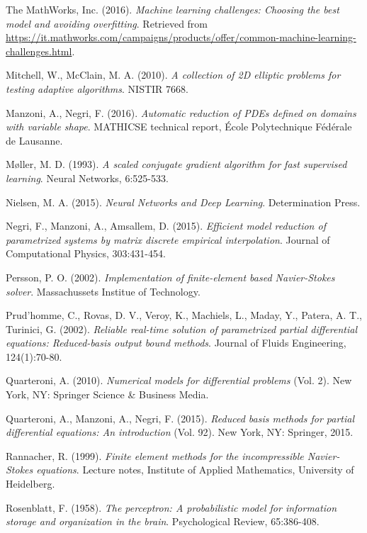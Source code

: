 \documentclass[longtitle]{elsarticle}
\numberwithin{equation}{section}
\theoremstyle{theorem}
\theoremstyle{definition}
\theoremstyle{remark}
\theoremstyle{proposition}
\numberwithin{figure}{section}
\begin{document}
\begin{thebibliography}{50}
		The MathWorks, Inc. (2016). \emph{Machine learning challenges: Choosing the best model and avoiding overfitting}. Retrieved from \url{https://it.mathworks.com/campaigns/products/offer/common-machine-learning-challenges.html}.
		
		Mitchell, W., McClain, M. A. (2010). \emph{A collection of 2D elliptic problems for testing adaptive algorithms}. NISTIR 7668.
		
		Manzoni, A., Negri, F. (2016). \emph{Automatic reduction of PDEs defined on domains with variable shape}. MATHICSE technical report, \'Ecole Polytechnique F\'ed\'erale de Lausanne.
		
		\textcolor{deepgreen}{
			M\o{}ller, M. D. (1993). \emph{A scaled conjugate gradient algorithm for fast supervised learning}. Neural Networks, 6:525-533.
		}

		Nielsen, M. A. (2015). \emph{Neural Networks and Deep Learning}. Determination Press.
				
		Negri, F., Manzoni, A., Amsallem, D. (2015). \emph{Efficient model reduction of parametrized systems by matrix discrete empirical interpolation}. Journal of Computational Physics, 303:431-454.
		
		Persson, P. O. (2002). \emph{Implementation of finite-element based Navier-Stokes solver}. Massachussets Institue of Technology.
		
		Prud'homme, C., Rovas, D. V., Veroy, K., Machiels, L., Maday, Y., Patera, A. T., Turinici, G. (2002). \emph{Reliable real-time solution of parametrized partial differential equations: Reduced-basis output bound methods}. Journal of Fluids Engineering, 124(1):70-80.
		
		Quarteroni, A. (2010). \emph{Numerical models for differential problems} (Vol. 2). New York, NY: Springer Science \& Business Media.
		
		Quarteroni, A., Manzoni, A., Negri, F. (2015). \emph{Reduced basis methods for partial differential equations: An introduction} (Vol. 92). New York, NY: Springer, 2015.
		
		Rannacher, R. (1999). \emph{Finite element methods for the incompressible Navier-Stokes equations}. Lecture notes, Institute of Applied Mathematics, University of Heidelberg.
		
		Rosenblatt, F. (1958). \emph{The perceptron: A probabilistic model for information storage and organization in the brain}. Psychological Review, 65:386-408.
		

\end{thebibliography}
\end{document}
